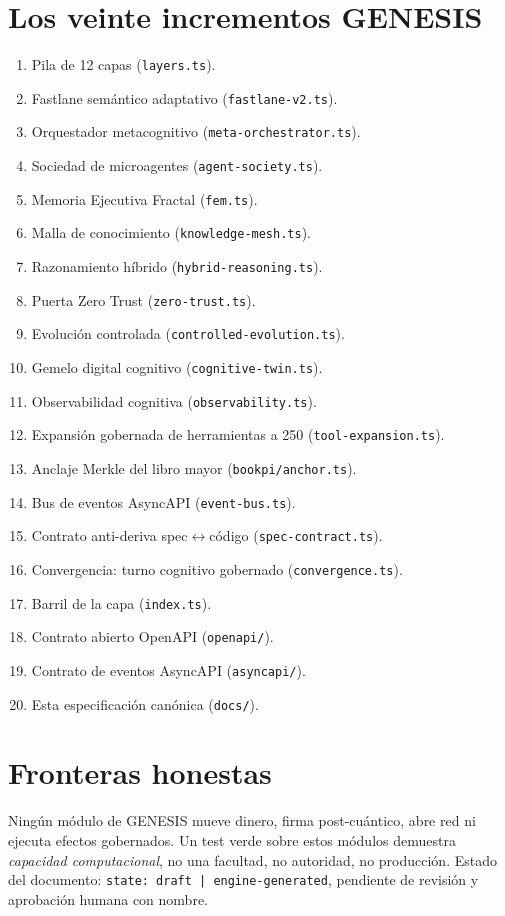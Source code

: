 \documentclass[11pt,a4paper]{article}
\begin{document}
\section{Los veinte incrementos GENESIS}
\begin{enumerate}[label=\arabic*.]
  \item Pila de 12 capas (\texttt{layers.ts}).
  \item Fastlane semántico adaptativo (\texttt{fastlane-v2.ts}).
  \item Orquestador metacognitivo (\texttt{meta-orchestrator.ts}).
  \item Sociedad de microagentes (\texttt{agent-society.ts}).
  \item Memoria Ejecutiva Fractal (\texttt{fem.ts}).
  \item Malla de conocimiento (\texttt{knowledge-mesh.ts}).
  \item Razonamiento híbrido (\texttt{hybrid-reasoning.ts}).
  \item Puerta Zero Trust (\texttt{zero-trust.ts}).
  \item Evolución controlada (\texttt{controlled-evolution.ts}).
  \item Gemelo digital cognitivo (\texttt{cognitive-twin.ts}).
  \item Observabilidad cognitiva (\texttt{observability.ts}).
  \item Expansión gobernada de herramientas a 250 (\texttt{tool-expansion.ts}).
  \item Anclaje Merkle del libro mayor (\texttt{bookpi/anchor.ts}).
  \item Bus de eventos AsyncAPI (\texttt{event-bus.ts}).
  \item Contrato anti-deriva spec\(\leftrightarrow\)código (\texttt{spec-contract.ts}).
  \item Convergencia: turno cognitivo gobernado (\texttt{convergence.ts}).
  \item Barril de la capa (\texttt{index.ts}).
  \item Contrato abierto OpenAPI (\texttt{openapi/}).
  \item Contrato de eventos AsyncAPI (\texttt{asyncapi/}).
  \item Esta especificación canónica (\texttt{docs/}).
\end{enumerate}

\section{Fronteras honestas}
Ningún módulo de GENESIS mueve dinero, firma post-cuántico, abre red ni ejecuta efectos
gobernados. Un test verde sobre estos módulos demuestra \emph{capacidad computacional}, no
una facultad, no autoridad, no producción. Estado del documento: \texttt{state: draft |
engine-generated}, pendiente de revisión y aprobación humana con nombre.
\end{document}

